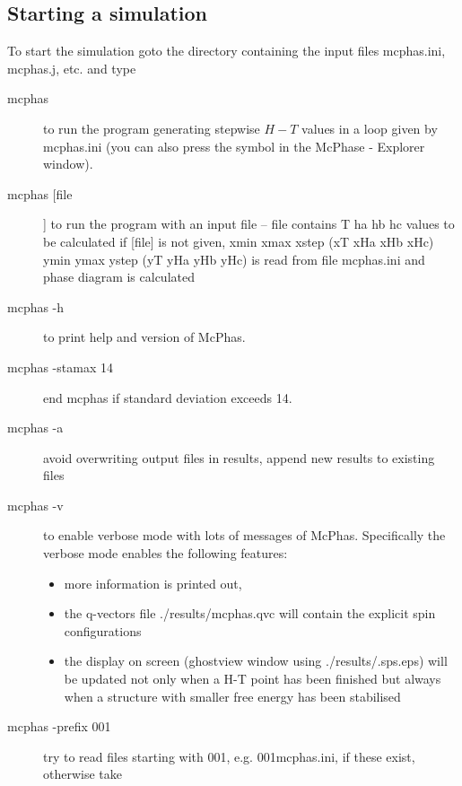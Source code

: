 \subsection{Starting a simulation}
\label{start}

To start the simulation goto the directory containing the
input files {\prg mcphas.ini, mcphas.j, etc. } and type

\begin{description}
\item[\prg mcphas] to run the program generating stepwise $H-T$ values 
              in a loop given by {\prg mcphas.ini} (you can also press the
              symbol in the {\prg McPhase - Explorer} window).
\item[\prg mcphas [file]]  to run the program with an input file --   
             {\prg file} contains T ha hb hc values to be calculated 
             if [file] is not given, xmin xmax xstep (xT xHa xHb xHc)
             ymin ymax ystep (yT yHa yHb yHc) is read from file {\prg mcphas.ini}
	     and phase diagram is calculated
\item[\prg mcphas -h]  to  print help and version of {\prg McPhas}.
\item[\prg mcphas -stamax 14]  end mcphas if standard deviation exceeds 14.
\item[\prg mcphas -a] avoid overwriting output files in results, append new results to existing files
\item[\prg mcphas -v]  to  enable verbose mode with lots of messages of {\prg McPhas}. Specifically
the verbose mode enables the following features:
  \begin{itemize}
			          \item more information is printed out, 
			          \item the q-vectors file {\prg ./results/mcphas.qvc} will contain 
				    the explicit spin configurations
			          \item the display on screen (ghostview window using 
				     {\prg ./results/.sps.eps}) will be updated not only 
				    when a H-T point has been finished but always 
				    when a structure with smaller free energy 
				    has been stabilised
  \end{itemize}
 \item[\prg mcphas  -prefix 001  ]  try to read files starting with 001, e.g.
 		    001mcphas.ini, if these exist, otherwise take

\end{description}
